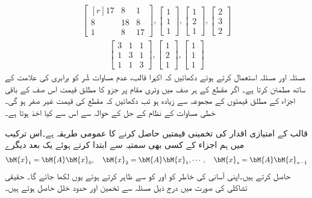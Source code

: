 \quad
\begin{align*}
\begin{bmatrix*}[r]17&8&1\\ 8&18&8\\1&8&17\end{bmatrix*}, \begin{bmatrix}1\\1\\1  \end{bmatrix}, \begin{bmatrix}1\\2\\1  \end{bmatrix},
\begin{bmatrix}2\\3\\2  \end{bmatrix}
\end{align*}
\begin{align*}
\begin{bmatrix} 3&1&1\\1&3&1\\1&1&3 \end{bmatrix},\begin{bmatrix}1\\2\\1  \end{bmatrix},\begin{bmatrix}1\\1\\1  \end{bmatrix}
\end{align*}
\quad
مسئلہ  اور مسئلہ  استعمال کرتے ہوئے دکھائیں کہ اکہرا قالب،  عدم مساوات شُر کو برابری کی علامت کے ساتھ مطمئن کرتا ہے۔ 
\quad {} \quad
اگر مقطع کے ہر صف میں وتری مقام پر جزو کا مطلق قیمت اس صف کے باقی اجزاء کے مطلق قیمتوں کے مجموعہ سے زیادہ ہو تب دکھائیں کہ مقطع کی قیمت غیر صفر ہو گی۔خطی مساوات کے نظام کے حل کے حوالہ سے اس سے کیا اخذ ہوتا  ہے۔


 قالب  کے امتیازی اقدار کی تخمینی قیمتیں حاصل کرنے کا عمومی طریقہ  ہے۔اس ترکیب میں ہم   اجزاء کے کسی بھی سمتیہ  سے ابتدا کرتے ہوئے  یک بعد دیگرے
\begin{align*}
\bM{x}_1=\bM{A}\bM{x}_0,\quad \bM{x}_2=\bM{A}\bM{x}_1,\cdots,\quad \bM{x}_s=\bM{A}\bM{x}_{s-1}
\end{align*}
حاصل کرتے ہیں۔اپنی آسانی کی خاطر   کو  اور  کو  سے ظاہر کرتے ہوئے یوں  لکھا جائے گا۔ حقیقی تشاکلی  کی صورت میں درج ذیل مسئلہ سے تخمین اور حدود خلل حاصل ہوتے ہیں۔

